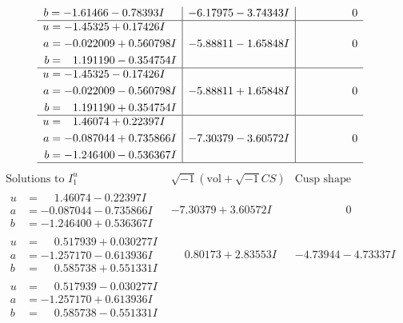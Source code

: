 \documentclass[1p]{elsarticle_modified}
\theoremstyle{definition}
\newcommand{\I}{\sqrt{-1}}
\begin{document}
$$\begin{array}{c|c|c}
\begin{aligned}
b &= -1.61466 - 0.78393 I\end{aligned}
 & -6.17975 - 3.74343 I & \phantom{-0.000000 } 0 \\ \hline\begin{aligned}
u &= -1.45325 + 0.17426 I \\
a &= -0.022009 + 0.560798 I \\
b &= \phantom{-}1.191190 - 0.354754 I\end{aligned}
 & -5.88811 - 1.65848 I & \phantom{-0.000000 } 0 \\ \hline\begin{aligned}
u &= -1.45325 - 0.17426 I \\
a &= -0.022009 - 0.560798 I \\
b &= \phantom{-}1.191190 + 0.354754 I\end{aligned}
 & -5.88811 + 1.65848 I & \phantom{-0.000000 } 0 \\ \hline\begin{aligned}
u &= \phantom{-}1.46074 + 0.22397 I \\
a &= -0.087044 + 0.735866 I \\
b &= -1.246400 - 0.536367 I\end{aligned}
 & -7.30379 - 3.60572 I & \phantom{-0.000000 } 0\\
 \hline 
 \end{array}$$\newpage$$\begin{array}{c|c|c}  
\text{Solutions to }I^u_{1}& \I (\text{vol} + \sqrt{-1}CS) & \text{Cusp shape}\\
 \hline 
\begin{aligned}
u &= \phantom{-}1.46074 - 0.22397 I \\
a &= -0.087044 - 0.735866 I \\
b &= -1.246400 + 0.536367 I\end{aligned}
 & -7.30379 + 3.60572 I & \phantom{-0.000000 } 0 \\ \hline\begin{aligned}
u &= \phantom{-}0.517939 + 0.030277 I \\
a &= -1.257170 - 0.613936 I \\
b &= \phantom{-}0.585738 + 0.551331 I\end{aligned}
 & \phantom{-}0.80173 + 2.83553 I & -4.73944 - 4.73337 I \\ \hline\begin{aligned}
u &= \phantom{-}0.517939 - 0.030277 I \\
a &= -1.257170 + 0.613936 I \\
b &= \phantom{-}0.585738 - 0.551331 I\end{aligned}

\end{array}$$
\end{document}
